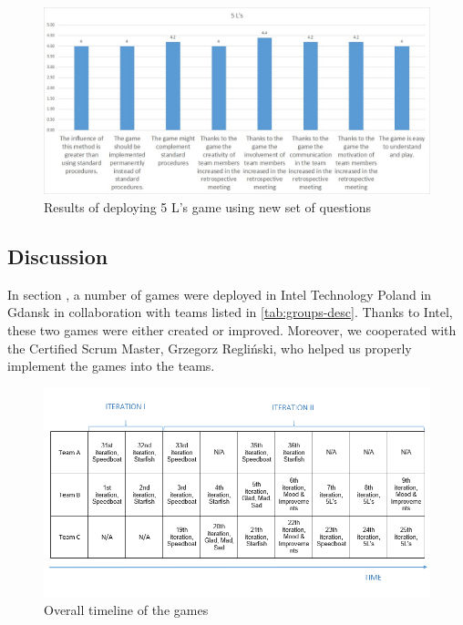 \begin{figure}[!htbp]
\caption{Results of deploying 5 L's game using new set of questions}
\label{fig:5lResultsNew}
\centering
\includegraphics[width=1\textwidth]{charts/5LNewSet}
\end{figure}

\subsection{Discussion}

In section , a number of games were deployed in Intel Technology Poland in Gdansk in collaboration with teams listed in  \autoref{tab:groups-desc}. Thanks to Intel, these two games were either created or improved.  Moreover,  we  cooperated  with the Certified  Scrum  Master,  Grzegorz Regliński, who helped us properly implement the games into the teams.

\begin{figure}[!htbp]
\caption{Overall timeline of the games}
\label{fig:overallTimeline}
\centering
\includegraphics[width=1\textwidth]{img/overall}
\end{figure}

